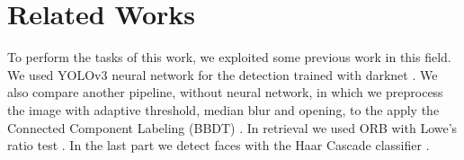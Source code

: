 \section{Related Works}
To perform the tasks of this work, we exploited some previous work in this field. We used YOLOv3 neural network \cite{yolov3} for the detection trained with darknet \cite{darknet}. We also compare another pipeline, without neural network, in which we preprocess the image with adaptive threshold, median blur \cite{median-blur} and opening, to the apply the Connected Component Labeling (BBDT) \cite{Grana_ccl}. In retrieval we used ORB \cite{orb} with Lowe's ratio test \cite{sift}. In the last part we detect faces with the Haar Cascade classifier \cite{haar_cascade}.
